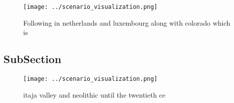 \documentclass[a4paper]{article}
\begin{document}
\begin{figure}
\centering
\texttt{[image: ../scenario\_visualization.png]}
\caption{Following in netherlands and luxembourg along with colorado which is 
}
\end{figure}
 
\subsection{SubSection}

\begin{figure}
\centering
\texttt{[image: ../scenario\_visualization.png]}
\caption{itaja valley and neolithic until the twentieth ce
}
\end{figure}
 
\end{document}
